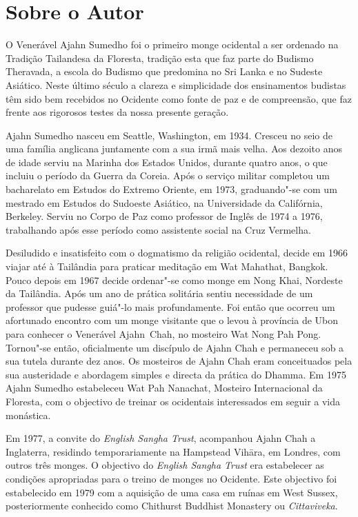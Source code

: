 \chapter{Sobre o Autor}

\enlargethispage{\baselineskip}

O Venerável Ajahn Sumedho foi o primeiro monge ocidental a ser ordenado na 
Tradição Tailandesa da Floresta, tradição esta que faz parte do Budismo Theravada, 
a escola do Budismo que predomina no Sri Lanka e no Sudeste Asiático.
Neste último século a clareza e simplicidade dos ensinamentos budistas têm sido
bem recebidos no Ocidente como fonte de paz e de compreensão, que faz frente
aos rigorosos testes da nossa presente geração.

Ajahn Sumedho nasceu em Seattle, Washington, em 1934. Cresceu no seio de uma
família anglicana juntamente com a sua irmã mais velha. Aos dezoito anos de idade
serviu na Marinha dos Estados Unidos, durante quatro anos, o que incluiu o
período da Guerra da Coreia. Após o serviço militar completou um bacharelato em
Estudos do Extremo Oriente, em 1973, graduando"-se com um mestrado em Estudos do
Sudoeste Asiático, na Universidade da Califórnia, Berkeley. Serviu no Corpo de
Paz como professor de Inglês de 1974 a 1976, trabalhando após esse período como
assistente social na Cruz Vermelha.

Desiludido e insatisfeito com o dogmatismo da religião ocidental, decide em 1966
viajar até à Tailândia para praticar meditação em Wat Mahathat, Bangkok. Pouco
depois em 1967 decide ordenar"-se como monge em Nong Khai, Nordeste da Tailândia.
Após um ano de prática solitária sentiu necessidade de um professor que pudesse
guiá"-lo mais profundamente. Foi então que ocorreu um afortunado encontro com um
monge visitante que o levou à província de Ubon para conhecer o Venerável
Ajahn~Chah,
no mosteiro Wat Nong Pah Pong. Tornou"-se então, oficialmente um discípulo
de Ajahn Chah e permaneceu sob a sua tutela durante dez anos. Os mosteiros de
Ajahn Chah eram conceituados pela sua austeridade e abordagem simples e directa
da prática do Dhamma. Em 1975 Ajahn Sumedho estabeleceu Wat Pah Nanachat,
Mosteiro Internacional da Floresta, com o objectivo de treinar os ocidentais
interessados em seguir a vida monástica.

Em 1977, a convite do \emph{English Sangha Trust}, acompanhou Ajahn Chah a
Inglaterra, residindo temporariamente na Hampstead Vihāra, em Londres, com
outros três monges. O objectivo do \emph{English Sangha Trust} era estabelecer
as condições apropriadas para o treino de monges no Ocidente. Este objectivo foi
estabelecido em 1979 com a aquisição de uma casa em ruínas em West Sussex,
posteriormente conhecido como Chithurst Buddhist Monastery ou
\emph{Cittaviveka}.

